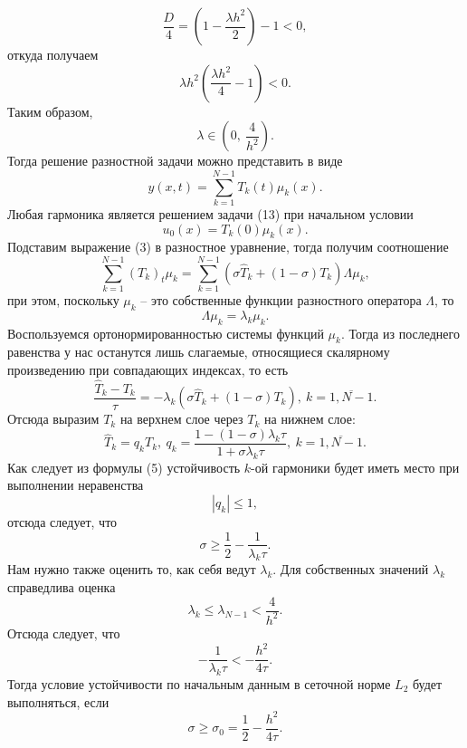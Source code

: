 \documentclass[a4paper, 12pt]{article}
\begin{document}
    $$\dfrac D 4 = \left(1 - \dfrac{\lambda h^2}{2}\right) - 1 < 0,$$
    откуда получаем
    $$\lambda h^2 \left( \dfrac{\lambda h^2}{4} - 1\right) < 0.$$
    Таким образом, $$\lambda \in \left(0,\ \dfrac{4}{h^2}\right).$$
    Тогда решение разностной задачи можно представить в виде
    \begin{equation}
    	y(x,t) = \sum_{k=1}^{N-1}T_k(t)\mu_k(x).
    \end{equation}
    Любая гармоника является решением задачи (13) при начальном условии $$u_0(x)= T_k(0)\mu_k(x).$$
    Подставим выражение (3) в разностное уравнение, тогда получим соотношение
    \begin{equation*}
    	\sum_{k=1}^{N-1} (T_k)_t \mu_k = \sum_{k=1}^{N-1} (\sigma \hat T_k + (1-\sigma)T_k)\Lambda \mu_k,
    \end{equation*}
    при этом, поскольку $\mu_k$ -- это собственные функции разностного оператора $\Lambda$, то
    $$\Lambda \mu_k = \lambda_k \mu _k.$$
    Воспользуемся ортонормированностью системы функций $\mu_k$. Тогда из последнего равенства у нас останутся лишь слагаемые, относящиеся скалярному произведению при совпадающих индексах, то есть
    $$\dfrac{\hat T_k - T_k}{\tau} = -\lambda_k (\sigma \hat T_k + (1-\sigma)T_k),\ k=\overline{1, N-1}.$$
    Отсюда выразим $T_k$ на верхнем слое через $T_k$ на нижнем слое:
    \begin{equation}
    	\hat T_k = q_k T_k,\ q_k = \dfrac{1 - (1-\sigma)\lambda_k \tau}{1+\sigma \lambda_k \tau},\ k = \overline {1, N-1}.
    \end{equation}
    Как следует из формулы (5) устойчивость $k$-ой гармоники будет иметь место при выполнении неравенства
    $$|q_k|\leq 1,$$
    отсюда следует, что 
    $$\sigma \geq \dfrac 12 - \dfrac{1}{\lambda_k \tau}.$$
    Нам нужно также оценить то, как себя ведут $\lambda_k$. Для собственных значений $\lambda_k$ справедлива оценка
    $$\lambda_k \leq \lambda _{N-1} < \dfrac{4}{h^2}.$$
    Отсюда следует, что 
    $$-\dfrac{1}{\lambda_k\tau} < -\dfrac{h^2}{4\tau}.$$
    Тогда условие устойчивости по начальным данным в сеточной норме $L_2$ будет выполняться, если 
    \begin{equation}
    	\sigma \geq \sigma_0 = \dfrac 12 - \dfrac {h^2}{4\tau}.
    \end{equation}
\end{document}

